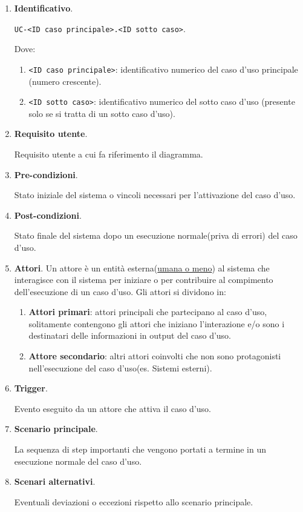 \begin{enumerate}
    \item \textbf{Identificativo}.
    
    \texttt{UC-<ID caso principale>.<ID sotto caso>}. 
    
    Dove:
    \begin{enumerate}
        \item \texttt{<ID caso principale>}: identificativo numerico del caso d'uso principale (numero crescente).

        \item \texttt{<ID sotto caso>}: identificativo numerico del sotto caso d'uso (presente solo se si tratta di un sotto caso d'uso).
    \end{enumerate}

    \item \textbf{Requisito utente}.
    
    Requisito utente a cui fa riferimento il diagramma.

    \item \textbf{Pre-condizioni}.
    
    Stato iniziale del sistema o vincoli necessari per l'attivazione del caso d'uso.

    \item \textbf{Post-condizioni}.
    
    Stato finale del sistema dopo un esecuzione normale(priva di errori) del caso d'uso.

    \item \textbf{Attori}.
    Un attore è un entità esterna(\underline{umana o meno}) al sistema che interagisce con il sistema per iniziare o per contribuire al compimento dell'esecuzione di un caso d'uso.  
    Gli attori si dividono in:
    \begin{enumerate}
        \item  \textbf{Attori primari}: attori principali che partecipano al caso d'uso, solitamente contengono gli attori che iniziano l'interazione e/o sono i destinatari delle informazioni in output del caso d'uso.
        \item \textbf{Attore secondario}: altri attori coinvolti che non sono protagonisti nell'esecuzione del caso d'uso(es. Sistemi esterni).
    \end{enumerate}

    \item \textbf{Trigger}.
    
    Evento eseguito da un attore che attiva il caso d'uso.

    \item \textbf{Scenario principale}.
    
    La sequenza di step importanti che vengono portati a termine in un esecuzione normale del caso d'uso.
    
    \item \textbf{Scenari alternativi}.

    Eventuali deviazioni o eccezioni rispetto allo scenario principale.
\end{enumerate}

